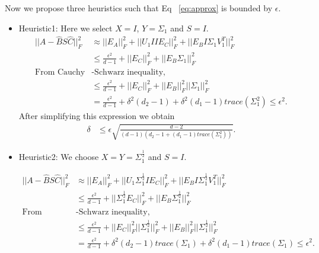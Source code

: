 \documentclass[runningheads]{llncs}
\begin{document}
\noindent Now we propose three heuristics such that Eq ~\ref{eq:approx} is bounded by $\epsilon$.
\begin{itemize}
	\item Heuristic1: Here we select $X = I$, $Y = \Sigma_1$ and $S = I$.	
	\begin{align*}
	||A - \hat{B} S \hat{C}||_F^2 &\approx ||E_A||_F^2 + ||U_1IIE_C||_F^2 + ||E_BI\Sigma_1V_1^T||_F^2 \\
	&\le \frac{\epsilon^2}{d-1}  + ||E_C||_F^2 + ||E_B\Sigma_1||_F^2 \\
	\text{From Cauchy} & \text{-Schwarz inequality,}\\
	&\le \frac{\epsilon^2}{d-1}  + ||E_C||_F^2 + ||E_B||_F^2  ||\Sigma_1||_F^2  \\
	&= \frac{\epsilon^2}{d-1} + \delta^2 (d_2-1)+ \delta^2  (d_1-1) trace(\Sigma_1^2)\le \epsilon^2.
	\end{align*}
	\noindent After simplifying this expression we obtain
	\begin{align*}
	\delta &\le \epsilon \sqrt{\frac{d-2}{(d-1) (d_2 -1 + (d_1-1) trace(\Sigma_1^2))}}.
	\end{align*}
	
	\item Heuristic2: We choose $X=Y=\Sigma_1^{\frac{1}{2}}$ and $S=I$.
	
	\begin{align*}
	||A - \hat{B} S \hat{C}||_F^2 &\approx ||E_A||_F^2 + ||U_1 \Sigma_1^{\frac{1}{2}} IE_C||_F^2 + ||E_B I \Sigma_1^{\frac{1}{2}} V_1^T||_F^2 \\
	&\le \frac{\epsilon^2}{d-1}  + ||\Sigma_1^{\frac{1}{2}} E_C||_F^2 + ||E_B \Sigma_1^{\frac{1}{2}}||_F^2 \\
	\text{From Cauchy} & \text{-Schwarz inequality,}\\
	&\le \frac{\epsilon^2}{d-1}  + ||E_C||_F^2 ||\Sigma_1^{\frac{1}{2}}||_F^2 + ||E_B||_F^2  ||\Sigma_1^{\frac{1}{2}}||_F^2  \\
	&= \frac{\epsilon^2}{d-1} + \delta^2 (d_2-1) trace(\Sigma_1) + \delta^2 (d_1 -1) trace(\Sigma_1)\le \epsilon^2.
	\end{align*}
	

\end{itemize}
\end{document}
